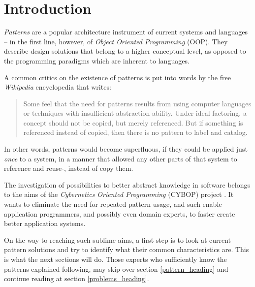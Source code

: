 %
%
%
%
%
%
%

\section{Introduction}
\label{introduction_heading}

\emph{Patterns} are a popular architecture instrument of current systems and
languages -- in the first line, however, of \emph{Object Oriented Programming}
(OOP). They describe design solutions that belong to a higher conceptual level,
as opposed to the programming paradigms which are inherent to languages.

A common critics on the existence of patterns is put into words by the free
\emph{Wikipedia} encyclopedia \cite{wikipedia} that writes:

\begin{quote}
    Some feel that the need for patterns results from using computer languages
    or techniques with insufficient abstraction ability. Under ideal factoring,
    a concept should not be copied, but merely referenced. But if something is
    referenced instead of copied, then there is no pattern to label and catalog.
\end{quote}

In other words, patterns would become superfluous, if they could be applied just
\emph{once} to a system, in a manner that allowed any other parts of that system
to reference and reuse-, instead of copy them.

The investigation of possibilities to better abstract knowledge in software
belongs to the aims of the \emph{Cybernetics Oriented Programming} (CYBOP)
project \cite{cybop}. It wants to eliminate the need for repeated pattern usage,
and such enable application programmers, and possibly even domain experts, to
faster create better application systems.

On the way to reaching such sublime aims, a first step is to look at current
pattern solutions and try to identify what their common characteristics are.
This is what the next sections will do. Those experts who sufficiently know the
patterns explained following, may skip over section \ref{pattern_heading} and
continue reading at section \ref{problems_heading}.
